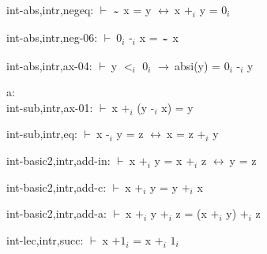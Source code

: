 \documentclass[a4paper]{article}
\newcommand{\tildesym}{\raisebox{-4pt}{\bf\~{}}}
\newcommand{\Fol}{\mbox{$\vdash\ $}}
\newcommand{\Imp}{\mbox{$\rightarrow\ $}}
\newcommand{\Equiv}{\mbox{$\leftrightarrow\ $}}
\begin{document}
int-abs,intr,negeq: 
 \Fol $\tildesym$ x = y \Equiv x $\mbox{+}_{i}$ y = $\mbox{0}_{i}$



int-abs,intr,neg-06: 
 \Fol $\mbox{0}_{i}$ $\mbox{-}_{i}$ x = $\tildesym$ x



int-abs,intr,ax-04: 
 \Fol y $\mbox{$<$}_{i}$ $\mbox{0}_{i}$ \Imp absi(y) = $\mbox{0}_{i}$ $\mbox{-}_{i}$ y



\bigskip

a:\\ int-sub,intr,ax-01: 
 \Fol x $\mbox{+}_{i}$ (y $\mbox{-}_{i}$ x) = y



int-sub,intr,eq: 
 \Fol x $\mbox{-}_{i}$ y = z \Equiv x = z $\mbox{+}_{i}$ y



int-basic2,intr,add-in: 
 \Fol x $\mbox{+}_{i}$ y = x $\mbox{+}_{i}$ z \Equiv y = z



int-basic2,intr,add-c: 
 \Fol x $\mbox{+}_{i}$ y = y $\mbox{+}_{i}$ x



int-basic2,intr,add-a: 
 \Fol x $\mbox{+}_{i}$ y $\mbox{+}_{i}$ z = (x $\mbox{+}_{i}$ y) $\mbox{+}_{i}$ z



int-lec,intr,succ: 
 \Fol x $\mbox{+1}_{i}$ = x $\mbox{+}_{i}$ $\mbox{1}_{i}$



\bigskip
\end{document}
